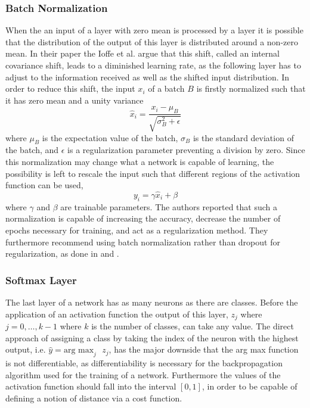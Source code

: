 
\subsubsection{Batch Normalization}

When the an input of a layer with zero mean is processed by a layer it is possible that the distribution of the output of this layer is distributed around a non-zero mean. In their paper \cite{Ioffe2015} the Ioffe et al. argue that this shift, called an internal covariance shift, leads to a diminished learning rate, as the following layer has to adjust to the information received as well as the shifted input distribution. In order to reduce this shift, the input $x_i$ of a batch $B$ is firstly normalized such that it has zero mean and a unity variance
\begin{equation}
\hat{x}_i = \frac{x_i-\mu_B}{\sqrt{\sigma_B^2+\epsilon}}
\end{equation}
where $\mu_B$ is the expectation value of the batch, $\sigma_B$ is the standard deviation of the batch, and $\epsilon$ is a regularization parameter preventing a division by zero. Since this normalization may change what a network is capable of learning, the possibility is left to rescale the input such that different regions of the activation function can be used,
\begin{equation}
y_i = \gamma \hat{x}_i + \beta
\end{equation}
where $\gamma$ and $\beta$ are trainable parameters. The authors reported that such a normalization is capable of increasing the accuracy, decrease the number of epochs necessary for training, and act as a regularization method. They furthermore recommend using batch normalization rather than dropout for regularization, as done in \cite{Szegedy2015} and \cite{He2015a}. 

\subsubsection{Softmax Layer}
The last layer of a network has as many neurons as there are classes. Before the application of an activation function the output of this layer, $z_j$ where $j=0,\dots,k-1$ where $k$ is the number of classes, can take any value. The direct approach of assigning a class by taking the index of the neuron with the highest output, i.e. $\hat{y} = \text{arg max}_j \text{ } z_j$, has the major downside that the arg max function is not differentiable, as differentiability is necessary for the backpropagation algorithm used for the training of a network. Furthermore the values of the activation function should fall into the interval $[0,1]$, in order to be capable of defining a notion of distance via a cost function. \\

